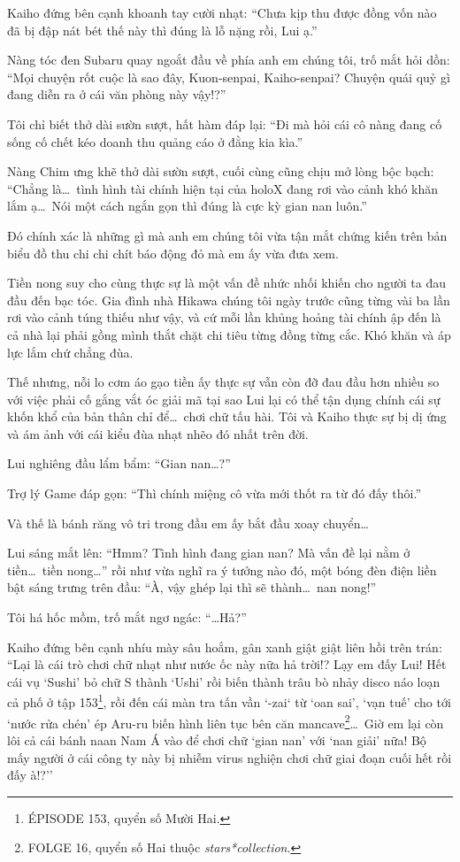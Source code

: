 \documentclass[../main.tex]{subfiles}
\begin{document}
Kaiho đứng bên cạnh khoanh tay cười nhạt: ``Chưa kịp thu được đồng vốn nào đã bị đập nát bét thế này thì đúng là lỗ nặng rồi, Lui ạ.''

Nàng tóc đen Subaru quay ngoắt đầu về phía anh em chúng tôi, trố mắt hỏi dồn: ``Mọi chuyện rốt cuộc là sao đây, Kuon-senpai, Kaiho-senpai? Chuyện quái quỷ gì đang diễn ra ở cái văn phòng này vậy!?''

Tôi chỉ biết thở dài sườn sượt, hất hàm đáp lại: ``Đi mà hỏi cái cô nàng đang cố sống cố chết kéo doanh thu quảng cáo ở đằng kia kìa.''

Nàng Chim ưng khẽ thở dài sườn sượt, cuối cùng cũng chịu mở lòng bộc bạch: ``Chẳng là\dots\ tình hình tài chính hiện tại của holoX đang rơi vào cảnh khó khăn lắm ạ\dots\ Nói một cách ngắn gọn thì đúng là cực kỳ gian nan luôn.''

Đó chính xác là những gì mà anh em chúng tôi vừa tận mắt chứng kiến trên bản biểu đồ thu chi chi chít báo động đỏ mà em ấy vừa đưa xem.

Tiền nong suy cho cùng thực sự là một vấn đề nhức nhối khiến cho người ta đau đầu đến bạc tóc. Gia đình nhà Hikawa chúng tôi ngày trước cũng từng vài ba lần rơi vào cảnh túng thiếu như vậy, và cứ mỗi lần khủng hoảng tài chính ập đến là cả nhà lại phải gồng mình thắt chặt chi tiêu từng đồng từng cắc. Khó khăn và áp lực lắm chứ chẳng đùa.

Thế nhưng, nỗi lo cơm áo gạo tiền ấy thực sự vẫn còn đỡ đau đầu hơn nhiều so với việc phải cố gắng vắt óc giải mã tại sao Lui lại có thể tận dụng chính cái sự khốn khổ của bản thân chỉ để\dots\ chơi chữ tấu hài. Tôi và Kaiho thực sự bị dị ứng và ám ảnh với cái kiểu đùa nhạt nhẽo đó nhất trên đời.

Lui nghiêng đầu lẩm bẩm: ``Gian nan\dots?''

Trợ lý Game đáp gọn: ``Thì chính miệng cô vừa mới thốt ra từ đó đấy thôi.''

Và thế là bánh răng vô tri trong đầu em ấy bắt đầu xoay chuyển\dots

Lui sáng mắt lên: ``Hmm? Tình hình đang gian nan? Mà vấn đề lại nằm ở tiền\dots\ tiền nong\dots'' rồi như vừa nghĩ ra ý tưởng nào đó, một bóng đèn điện liền bật sáng trưng trên đầu: ``À, vậy ghép lại thì sẽ thành\dots\ nan nong!''

Tôi há hốc mồm, trố mắt ngơ ngác: ``\dots Hả?''

Kaiho đứng bên cạnh nhíu mày sâu hoắm, gân xanh giật giật liên hồi trên trán: ``Lại là cái trò chơi chữ nhạt như nước ốc này nữa hả trời!? Lạy em đấy Lui! Hết cái vụ `Sushi' bỏ chữ S thành `Ushi' rồi biến thành trâu bò nhảy disco náo loạn cả phố ở tập 153\footnote{{\flaregothic ÉPISODE 153}, quyển số Mười Hai.}, rồi đến cái màn tra tấn vần `-zai` từ `oan sai', `vạn tuế' cho tới `nước rửa chén' ép Aru-ru biến hình liên tục bên căn mancave\footnote{{\humanist FOLGE 16}, quyển số Hai thuộc \textit{stars*collection}.}\dots\ Giờ em lại còn lôi cả cái bánh naan Nam Á vào để chơi chữ `gian nan' với `nan giải' nữa! Bộ mấy người ở cái công ty này bị nhiễm virus nghiện chơi chữ giai đoạn cuối hết rồi đấy à!?''
\end{document}
